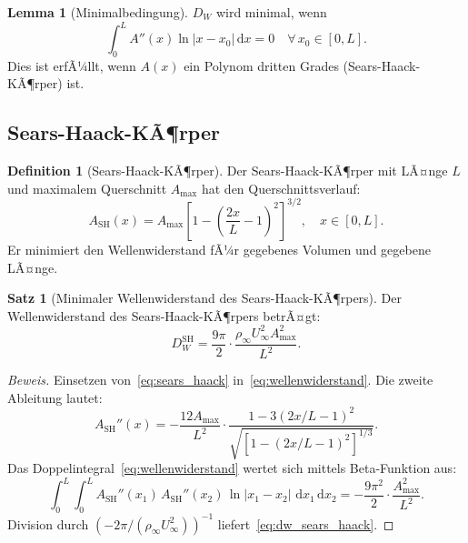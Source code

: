 ﻿\documentclass[12pt,a4paper]{article}
\theoremstyle{definition}
\newtheorem{definition}{Definition}[section]
\newtheorem{satz}{Satz}[section]
\newtheorem{lemma}{Lemma}[section]
\theoremstyle{remark}
\newenvironment{beweis}{\begin{proof}[Beweis]}{\end{proof}}
\newcommand{\dd}{\,\mathrm{d}}
\begin{document}
\begin{lemma}[Minimalbedingung]
  \label{lemma:minmal}
  $D_W$ wird minimal, wenn
  \begin{equation}
    \int_0^L A''(x) \ln|x - x_0| \dd x = 0 \quad \forall\, x_0 \in [0, L].
    \label{eq:minimalbedingung}
  \end{equation}
  Dies ist erfÃ¼llt, wenn $A(x)$ ein Polynom dritten Grades (Sears-Haack-KÃ¶rper) ist.
\end{lemma}

\subsection{Sears-Haack-KÃ¶rper}

\begin{definition}[Sears-Haack-KÃ¶rper]
  Der Sears-Haack-KÃ¶rper mit LÃ¤nge $L$ und maximalem Querschnitt $A_{\max}$ hat den
  Querschnittsverlauf:
  \begin{equation}
    A_\text{SH}(x) = A_{\max} \left[1 - \left(\frac{2x}{L} - 1\right)^2\right]^{3/2},
    \quad x \in [0, L].
    \label{eq:sears_haack}
  \end{equation}
  Er minimiert den Wellenwiderstand fÃ¼r gegebenes Volumen und gegebene LÃ¤nge.
\end{definition}

\begin{satz}[Minimaler Wellenwiderstand des Sears-Haack-KÃ¶rpers]
  \label{satz:sears_haack}
  Der Wellenwiderstand des Sears-Haack-KÃ¶rpers betrÃ¤gt:
  \begin{equation}
    D_W^\text{SH} = \frac{9\pi}{2} \cdot \frac{\rho_\infty U_\infty^2 A_{\max}^2}{L^2}.
    \label{eq:dw_sears_haack}
  \end{equation}
\end{satz}

\begin{beweis}
  Einsetzen von~\eqref{eq:sears_haack} in~\eqref{eq:wellenwiderstand}. Die zweite Ableitung
  lautet:
  \begin{equation}
    A_\text{SH}''(x) = -\frac{12 A_{\max}}{L^2} \cdot
    \frac{1 - 3(2x/L - 1)^2}{\sqrt{[1-(2x/L-1)^2]^{1/3}}}.
  \end{equation}
  Das Doppelintegral~\eqref{eq:wellenwiderstand} wertet sich mittels Beta-Funktion aus:
  \begin{equation}
    \int_0^L \int_0^L A_\text{SH}''(x_1)\, A_\text{SH}''(x_2)\, \ln|x_1 - x_2|\, \dd x_1 \dd x_2
    = -\frac{9\pi^2}{2}\cdot\frac{A_{\max}^2}{L^2}.
  \end{equation}
  Division durch $(-2\pi/(\rho_\infty U_\infty^2))^{-1}$ liefert~\eqref{eq:dw_sears_haack}.
  \qedhere
\end{beweis}
\end{document}
